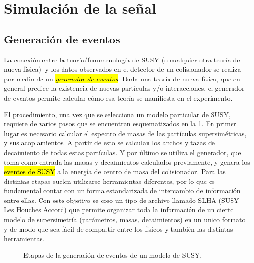 \section{Simulación de la se\~nal}\label{sec:sig_samples}

\subsection{Generación de eventos}

La conexión entre la teoría/fenomenología de SUSY (o cualquier otra teoría de
nueva física), y los datos observados en el detector de un
colisionador se realiza por medio de un \hl{\emph{generador de eventos}}. Dada una
teoría de nueva física, que en general predice la existencia de nuevas
partículas y/o interacciones, el generador de eventos permite calcular cómo esa
teoría se manifiesta en el experimento\cite{Baer:2009tk}.

El procedimiento, una vez que se selecciona un modelo particular de SUSY,
requiere de varios pasos que se encuentran esquematizados en la
\cref{fig:mc_sketch}. En primer lugar es necesario calcular el espectro de masas
de las partículas supersimétricas, y sus acoplamientos. A partir de esto se
calculan los anchos y tazas de decaimiento de todas estas partículas. Y por
último se utiliza el generador, que toma como entrada las masas y decaimientos
calculados previamente, y genera los \hl{eventos de SUSY} a la energía de centro de
masa del colisionador. Para las distintas etapas suelen utilizarse herramientas
diferentes, por lo que es fundamental contar con un forma estandarizada de
intercambio de información entre ellas. Con este objetivo se creo un tipo de
archivo llamado SLHA (SUSY Les Houches Accord)\cite{SLHA} que permite organizar
toda la información de un cierto modelo de supersimetría (parámetros, masas,
decaimientos) en un unico formato y de modo que sea fácil de compartir entre los
físicos y también las distintas herramientas.

\begin{figure}[h]
  \centering
  \scalebox{0.8}{}
  \caption{Etapas de la generación de eventos de un modelo de SUSY.}
  \label{fig:mc_sketch}
\end{figure}


